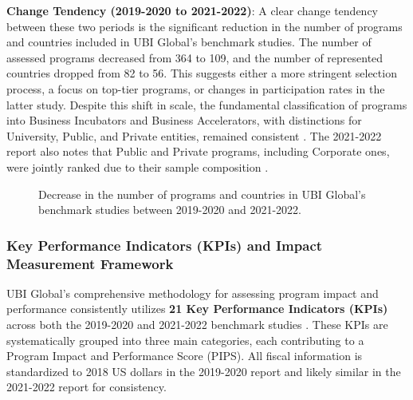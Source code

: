 \documentclass[../Main.tex]{subfiles}
\begin{document}
	\textbf{Change Tendency (2019-2020 to 2021-2022)}:
	A clear change tendency between these two periods is the significant reduction in the number of programs and countries included in UBI Global's benchmark studies. The number of assessed programs decreased from 364 to 109, and the number of represented countries dropped from 82 to 56. This suggests either a more stringent selection process, a focus on top-tier programs, or changes in participation rates in the latter study. Despite this shift in scale, the fundamental classification of programs into Business Incubators and Business Accelerators, with distinctions for University, Public, and Private entities, remained consistent \cite{ubi2019world, ubi2021world}. The 2021-2022 report also notes that Public and Private programs, including Corporate ones, were jointly ranked due to their sample composition \cite{ubi2021world}.
	
	\begin{figure}[h]
		\centering
		\caption{Decrease in the number of programs and countries in UBI Global's benchmark studies between 2019-2020 and 2021-2022.}
		\label{fig:ubi_change_tendency}
	\end{figure}
	
	\subsubsection{Key Performance Indicators (KPIs) and Impact Measurement Framework}
	UBI Global's comprehensive methodology for assessing program impact and performance consistently utilizes \textbf{21 Key Performance Indicators (KPIs)} across both the 2019-2020 and 2021-2022 benchmark studies \cite{ubi2019world, ubi2021world}. These KPIs are systematically grouped into three main categories, each contributing to a Program Impact and Performance Score (PIPS). All fiscal information is standardized to 2018 US dollars in the 2019-2020 report and likely similar in the 2021-2022 report for consistency.
	
\end{document}
